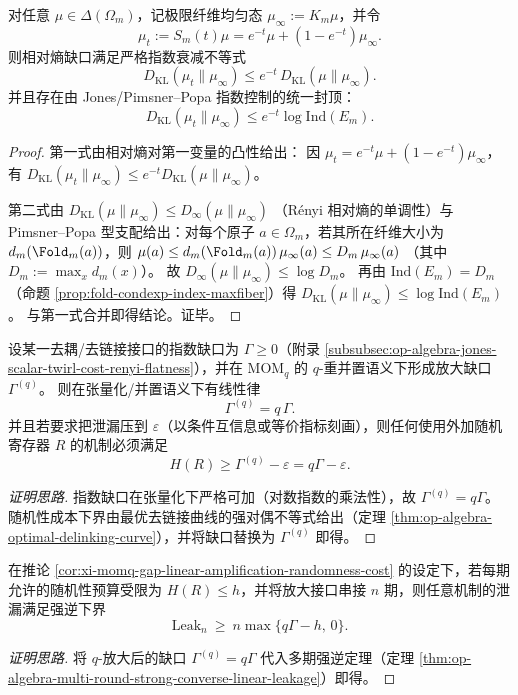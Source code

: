 \begin{proposition}\label{prop:xi-fiber-uniformization-kl-gap-exp-decay-index-cap}
对任意 \(\mu\in\Delta(\Omega_m)\)，记极限纤维均匀态 \(\mu_\infty:=K_m\mu\)，并令
\[
\mu_t:=S_m(t)\mu=e^{-t}\mu+(1-e^{-t})\mu_\infty.
\]
则相对熵缺口满足严格指数衰减不等式
\[
\boxed{\;
D_{\mathrm{KL}}(\mu_t\|\mu_\infty)\le e^{-t}\,D_{\mathrm{KL}}(\mu\|\mu_\infty).\;}
\]
并且存在由 Jones/Pimsner--Popa 指数控制的统一封顶：
\[
\boxed{\;
D_{\mathrm{KL}}(\mu_t\|\mu_\infty)\le e^{-t}\log\mathrm{Ind}(E_m).\;}
\]
\end{proposition}
\begin{proof}
第一式由相对熵对第一变量的凸性给出：
因 \(\mu_t=e^{-t}\mu+(1-e^{-t})\mu_\infty\)，有
\(
D_{\mathrm{KL}}(\mu_t\|\mu_\infty)\le e^{-t}D_{\mathrm{KL}}(\mu\|\mu_\infty)
\)。
\par
第二式由
\(
D_{\mathrm{KL}}(\mu\|\mu_\infty)\le D_\infty(\mu\|\mu_\infty)
\)
（Rényi 相对熵的单调性）与 Pimsner--Popa 型支配给出：对每个原子 \(a\in\Omega_m\)，若其所在纤维大小为 \(d_m(\Fold_m(a))\)，则
\(
\mu(a)\le d_m(\Fold_m(a))\,\mu_\infty(a)\le D_m\,\mu_\infty(a)
\)
（其中 \(D_m:=\max_x d_m(x)\)）。
故 \(D_\infty(\mu\|\mu_\infty)\le \log D_m\)。
再由 \(\mathrm{Ind}(E_m)=D_m\)（命题 \ref{prop:fold-condexp-index-maxfiber}）得
\(
D_{\mathrm{KL}}(\mu\|\mu_\infty)\le \log\mathrm{Ind}(E_m)
\)。
与第一式合并即得结论。证毕。
\end{proof}

\begin{corollary}\label{cor:xi-momq-gap-linear-amplification-randomness-cost}
设某一去耦/去链接接口的指数缺口为 \(\Gamma\ge 0\)（附录 \ref{subsubsec:op-algebra-jones-scalar-twirl-cost-renyi-flatness}），并在 \(\mathrm{MOM}_q\) 的 \(q\)-重并置语义下形成放大缺口 \(\Gamma^{(q)}\)。
则在张量化/并置语义下有线性律
\[
\boxed{\;\Gamma^{(q)}=q\,\Gamma.\;}
\]
并且若要求把泄漏压到 \(\varepsilon\)（以条件互信息或等价指标刻画），则任何使用外加随机寄存器 \(R\) 的机制必须满足
\[
\boxed{\;H(R)\ge \Gamma^{(q)}-\varepsilon=q\Gamma-\varepsilon.\;}
\]
\end{corollary}
\begin{proof}[证明思路]
指数缺口在张量化下严格可加（对数指数的乘法性），故 \(\Gamma^{(q)}=q\Gamma\)。
随机性成本下界由最优去链接曲线的强对偶不等式给出（定理 \ref{thm:op-algebra-optimal-delinking-curve}），并将缺口替换为 \(\Gamma^{(q)}\) 即得。
\end{proof}

\begin{corollary}\label{cor:xi-momq-strong-converse-bilinear-leakage}
在推论 \ref{cor:xi-momq-gap-linear-amplification-randomness-cost} 的设定下，若每期允许的随机性预算受限为 \(H(R)\le h\)，并将放大接口串接 \(n\) 期，则任意机制的泄漏满足强逆下界
\[
\boxed{\;
\mathrm{Leak}_n\ \ge\ n\max\{q\Gamma-h,\,0\}. \;}
\]
\end{corollary}
\begin{proof}[证明思路]
将 \(q\)-放大后的缺口 \(\Gamma^{(q)}=q\Gamma\) 代入多期强逆定理（定理 \ref{thm:op-algebra-multi-round-strong-converse-linear-leakage}）即得。
\end{proof}

